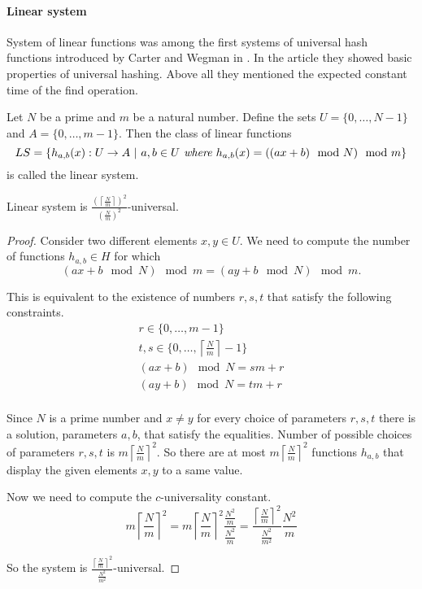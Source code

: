 \paragraph{Linear system}
System of linear functions was among the first systems of universal hash functions introduced by Carter and Wegman in \cite{DBLP:journals/jcss/CarterW79}. In the article they showed basic properties of universal hashing. Above all they mentioned the expected constant time of the find operation.
\begin{definition}
Let $N$ be a prime and $m$ be a natural number. Define the sets $U = \{0, \dots, N - 1 \}$ and $A = \{0, \dots, m - 1\}$. Then the class of linear functions 
\[ LS = \{h_{a, b}(x): U \rightarrow A \ | \  a, b \in U \textit{ where } h_{a, b}(x) = ((ax + b) \mod N) \mod m \} \]
is called the linear system.
\end{definition}

\begin{remark}
Linear system is $\frac{\left(\left\lceil \frac{N}{m} \right\rceil\right)^2}{\left(\frac{N}{m}\right)^2}$-universal.
\end{remark}
\begin{proof}
Consider two different elements $x, y \in U$. We need to compute the number of functions $h_{a, b} \in H$ for which 
\[ (ax + b \mod N) \mod m = (ay + b \mod N) \mod m \textit{.} \]

This is equivalent to the existence of numbers $r, s, t$ that satisfy the following constraints.
\begin{gather*}
r \in \{0, \dots, m - 1 \} \\
t, s \in \{0, \dots, \left \lceil \frac{N}{m} \right \rceil - 1\} \\
(ax + b) \mod N = s m + r \\
(ay + b) \mod N = t m + r \\
\end{gather*}

Since $N$ is a prime number and $x \neq y$ for every choice of parameters $r, s, t$ there is a solution, parameters $a, b$, that satisfy the equalities.
Number of possible choices of parameters $r, s, t$ is $m \left \lceil \frac{N}{m} \right \rceil ^ 2$. So there are at most $m \left \lceil \frac{N}{m} \right \rceil ^ 2$ functions $h_{a, b}$ that display the given elements $x, y$ to a same value.

Now we need to compute the $c$-universality constant.
\[
m \left \lceil \frac{N}{m} \right \rceil ^ 2 = 
m \left \lceil \frac{N}{m} \right \rceil ^ 2 \frac{\frac{N ^ 2}{m}}{\frac{N ^ 2}{m}} = 
\frac{\left \lceil \frac{N}{m} \right \rceil ^ 2}{\frac{N ^ 2}{m ^ 2}} \frac{N ^ 2}{m}
\]

So the system is $\frac{\left \lceil \frac{N}{m} \right \rceil ^ 2}{\frac{N ^ 2}{m ^ 2}}$-universal.
\end{proof}

